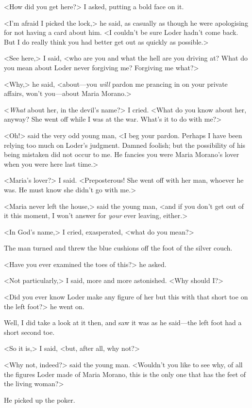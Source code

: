 <How did you get here?> I asked, putting a bold face on it.

<I'm afraid I picked the lock,> he said, as casually as though he were apologising for not having a card about him. <I couldn't be sure Loder hadn't come back. But I do really think you had better get out as quickly as possible.>

<See here,> I said, <who are you and what the hell are you driving at? What do you mean about Loder never forgiving me? Forgiving me what?>

<Why,> he said, <about—you \textit{will} pardon me prancing in on your private affairs, won't you—about Maria Morano.>

<\textit{What} about her, in the devil's name?> I cried. <What do you know about her, anyway? She went off while I was at the war. What's it to do with me?>

<Oh!> said the very odd young man, <I beg your pardon. Perhaps I have been relying too much on Loder's judgment. Damned foolish; but the possibility of his being mistaken did not occur to me. He fancies you were Maria Morano's lover when you were here last time.>

<Maria's lover?> I said. <Preposterous! She went off with her man, whoever he was. He must know she didn't go with me.>

<Maria never left the house,> said the young man, <and if you don't get out of it this moment, I won't answer for \textit{your} ever leaving, either.>

<In God's name,> I cried, exasperated, <what do you mean?>

The man turned and threw the blue cushions off the foot of the silver couch.

<Have you ever examined the toes of this?> he asked.

<Not particularly,> I said, more and more astonished. <Why should I\@?>

<Did you ever know Loder make any figure of her but this with that short toe on the left foot?> he went on.

Well, I did take a look at it then, and saw it was as he said—the left foot had a short second toe.

<So it is,> I said, <but, after all, why not?>

<Why not, indeed?> said the young man. <Wouldn't you like to see why, of all the figures Loder made of Maria Morano, this is the only one that has the feet of the living woman?>

He picked up the poker.

